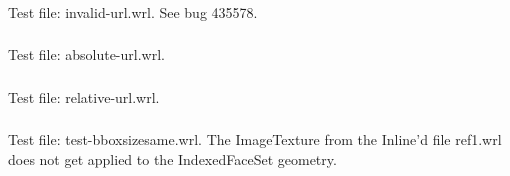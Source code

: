 \subsubsection{\InlC}
Test file: invalid-url.wrl.
See bug 435578.

\subsubsection{\InlD}
Test file: absolute-url.wrl.

\subsubsection{\InlE}
Test file: relative-url.wrl.

\subsubsection{\InlF}
Test file: test-bboxsizesame.wrl.\newline
The ImageTexture from the Inline'd file ref1.wrl does not get
applied to the IndexedFaceSet geometry.
